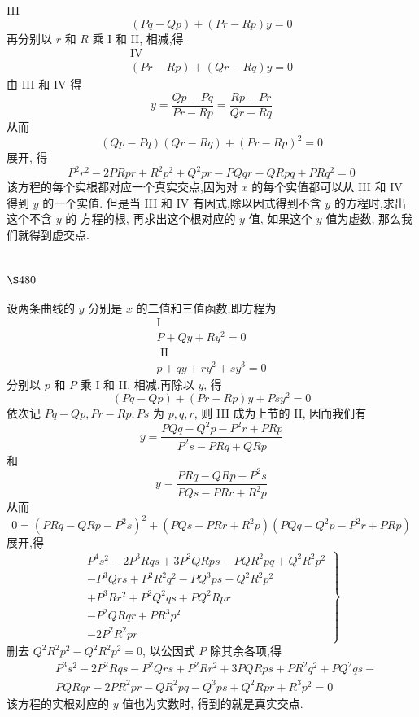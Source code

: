 III
\[
(P q-Q p)+(P r-R p) y=0
\]
再分别以 $r$ 和 $R$ 乘 I 和 II, 相减,得
\[
\begin{gathered}
\mathrm{IV} \\
(P r-R p)+(Q r-R q) y=0
\end{gathered}
\]
由 III 和 IV 得
\[
y=\frac{Q p-P q}{P r-R p}=\frac{R p-P r}{Q r-R q}
\]
从而
\[
(Q p-P q)(Q r-R q)+(P r-R p)^{2}=0
\]
展开, 得
\[
P^{2} r^{2}-2 P R p r+R^{2} p^{2}+Q^{2} p r-P Q q r-Q R p q+P R q^{2}=0
\]
该方程的每个实根都对应一个真实交点,因为对 $x$ 的每个实值都可以从 III 和 IV 得到 $y$ 的一个实值. 但是当 III 和 IV 有因式,除以因式得到不含 $y$ 的方程时,求出这个不含 $y$ 的 方程的根, 再求出这个根对应的 $y$ 值, 如果这个 $y$ 值为虚数, 那么我们就得到虚交点. 

\section{$\S 480$}

设两条曲线的 $y$ 分别是 $x$ 的二值和三值函数,即方程为
\[
\begin{gathered}
\mathrm{I} \\
P+Q y+R y^{2}=0 \\
\text { II } \\
p+q y+r y^{2}+s y^{3}=0
\end{gathered}
\]
分别以 $p$ 和 $P$ 乘 $\mathrm{I}$ 和 II, 相减,再除以 $y$, 得
\[
(P q-Q p)+(P r-R p) y+P s y^{2}=0
\]
依次记 $P q-Q p, P r-R p, P s$ 为 $p, q, r$, 则 III 成为上节的 II, 因而我们有
\[
y=\frac{P Q q-Q^{2} p-P^{2} r+P R p}{P^{2} s-P R q+Q R p}
\]
和
\[
y=\frac{P R q-Q R p-P^{2} s}{P Q s-P R r+R^{2} p}
\]
从而
\[
0=\left(P R q-Q R p-P^{2} s\right)^{2}+\left(P Q s-P R r+R^{2} p\right)\left(P Q q-Q^{2} p-P^{2} r+P R p\right)
\]
展开,得
\[
\left.\begin{array}{l}
P^{4} s^{2}-2 P^{3} R q s+3 P^{2} Q R p s-P Q R^{2} p q+Q^{2} R^{2} p^{2} \\
-P^{3} Q r s+P^{2} R^{2} q^{2}-P Q^{3} p s-Q^{2} R^{2} p^{2} \\
+P^{3} R r^{2}+P^{2} Q^{2} q s+P Q^{2} R p r \\
-P^{2} Q R q r+P R^{3} p^{2} \\
-2 P^{2} R^{2} p r
\end{array}\right\}
\]
删去 $Q^{2} R^{2} p^{2}-Q^{2} R^{2} p^{2}=0$, 以公因式 $P$ 除其余各项,得
\[
\begin{aligned}
& P^{3} s^{2}-2 P^{2} R q s-P^{2} Q r s+P^{2} R r^{2}+3 P Q R p s+P R^{2} q^{2}+P Q^{2} q s- \\
& P Q R q r-2 P R^{2} p r-Q R^{2} p q-Q^{3} p s+Q^{2} R p r+R^{3} p^{2}=0
\end{aligned}
\]
该方程的实根对应的 $y$ 值也为实数时, 得到的就是真实交点.

